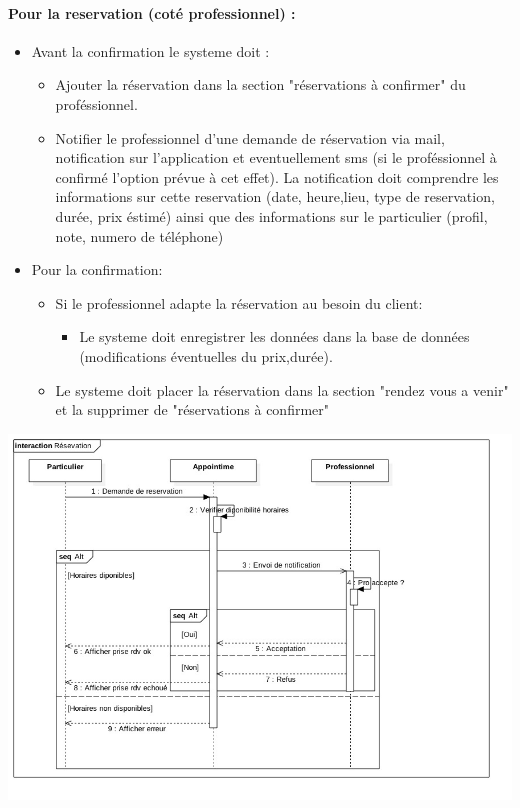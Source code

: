 \documentclass{article}
\begin{document}
\paragraph{Pour la reservation (coté professionnel) :}
\begin{itemize}
\item Avant la confirmation le systeme doit :
	\begin{itemize}
	\item Ajouter la réservation dans la section "réservations à confirmer" du  proféssionnel.
    \item Notifier le professionnel d'une demande de réservation via mail, notification sur l'application et eventuellement sms (si le proféssionnel à confirmé l'option prévue à cet effet).
		La notification doit comprendre les informations sur cette reservation (date, heure,lieu, type de reservation, durée, prix éstimé)
		ainsi que des informations sur le particulier (profil, note, numero de téléphone)
	\end{itemize}
\item Pour la confirmation:
	\begin{itemize}
	\item Si le professionnel adapte la réservation au besoin du client:
		\begin{itemize}
		\item Le systeme doit enregistrer les données dans la base de données (modifications éventuelles du prix,durée).
		\end{itemize}
	\end{itemize}
	\begin{itemize}
    \item Le systeme doit placer la réservation dans la section "rendez vous a venir" et la supprimer de "réservations à confirmer"
	\end{itemize}
\end{itemize}

\includegraphics[scale=0.5]{ShematDiagrammes/sequenceReservation.jpg}
\end{document}
